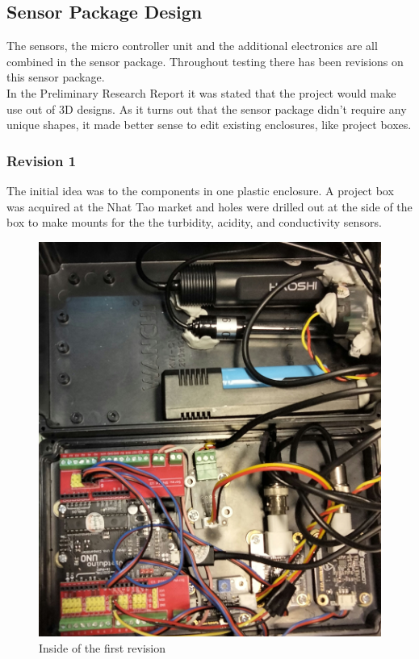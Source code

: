 \newpage
\subsection{Sensor Package Design}
The sensors, the micro controller unit and the additional electronics are all combined in the sensor package. Throughout testing there has been revisions on this sensor package.\\

In the Preliminary Research Report it was stated that the project would make use out of \gls{3D} designs. As it turns out that the sensor package didn't require any unique shapes, it made better sense to edit existing enclosures, like project boxes.

\subsubsection{Revision 1}
The initial idea was to the components in one plastic enclosure. A project box was acquired at the Nhat Tao market and holes were drilled out at the side of the box to make mounts for the the turbidity, acidity, and conductivity sensors.

\begin{figure}[h]
\centering
\includegraphics[scale=0.1]{070_design/package/51_rev1.jpg}
\caption{Inside of the first revision}
\end{figure}

